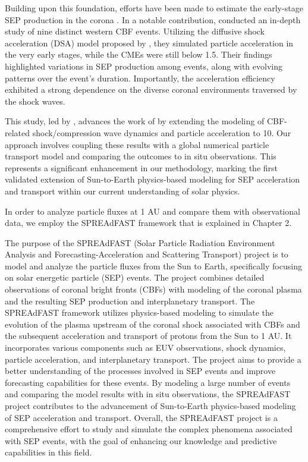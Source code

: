 Building upon this foundation, efforts have been made to estimate the early-stage SEP production in the corona \citep{kozarev_2013, schwadron_2015}. In a notable contribution, \citet{kozarev_2019} conducted an in-depth study of nine distinct western CBF events. Utilizing the diffusive shock acceleration (DSA) model proposed by \citet{kozarev_2016}, they simulated particle acceleration in the very early stages, while the CMEs were still below 1.5\rsun. Their findings highlighted variations in SEP production among events, along with evolving patterns over the event's duration. Importantly, the acceleration efficiency exhibited a strong dependence on the diverse coronal environments traversed by the shock waves.

This study, led by \citet{kozarev_2022}, advances the work of \citet{kozarev_2019} by extending the modeling of CBF-related shock/compression wave dynamics and particle acceleration to 10\rsun. Our approach involves coupling these results with a global numerical particle transport model and comparing the outcomes to in situ observations. This represents a significant enhancement in our methodology, marking the first validated extension of Sun-to-Earth physics-based modeling for SEP acceleration and transport within our current understanding of solar physics.





In order to analyze particle fluxes at 1 AU and compare them with observational data, we employ the SPREAdFAST framework that is explained in Chapter 2.

The purpose of the SPREAdFAST (Solar Particle Radiation Environment Analysis and Forecasting-Acceleration and Scattering Transport) project is to model and analyze the particle fluxes from the Sun to Earth, specifically focusing on solar energetic particle (SEP) events. The project combines detailed observations of coronal bright fronts (CBFs) with modeling of the coronal plasma and the resulting SEP production and interplanetary transport. The SPREAdFAST framework utilizes physics-based modeling to simulate the evolution of the plasma upstream of the coronal shock associated with CBFs and the subsequent acceleration and transport of protons from the Sun to 1 AU. It incorporates various components such as EUV observations, shock dynamics, particle acceleration, and interplanetary transport. The project aims to provide a better understanding of the processes involved in SEP events and improve forecasting capabilities for these events. By modeling a large number of events and comparing the model results with in situ observations, the SPREAdFAST project contributes to the advancement of Sun-to-Earth physics-based modeling of SEP acceleration and transport. Overall, the SPREAdFAST project is a comprehensive effort to study and simulate the complex phenomena associated with SEP events, with the goal of enhancing our knowledge and predictive capabilities in this field.

